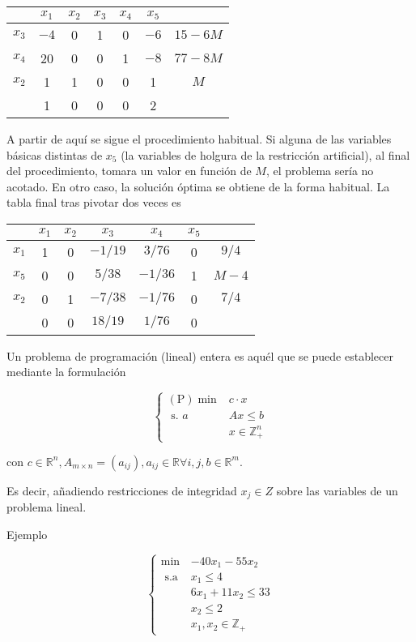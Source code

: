 \documentclass[openany]{book}
\begin{document}
\begin{example}
  \begin{tabular}{l|ccccc|c}
  \hline & $x_{1}$ & $x_{2}$ & $x_{3}$ & $x_{4}$ & $x_{5}$ & \\
  \hline$x_{3}$ & $-4$ & 0 & 1 & 0 & $-6$ & $15-6 M$ \\
  $x_{4}$ & 20 & 0 & 0 & 1 & $-8$ & $77-8 M$ \\
  $x_{2}$ & 1 & 1 & 0 & 0 & 1 & $M$ \\
  \hline & 1 & 0 & 0 & 0 & 2 & \\
  \hline
  \end{tabular}

  A partir de aquí se sigue el procedimiento habitual. Si alguna de las variables básicas distintas de $x_{5}$ (la variables de holgura de la restricción artificial), al final del procedimiento, tomara un valor en función de $M$, el problema sería no acotado. En otro caso, la solución óptima se obtiene de la forma habitual. La tabla final tras pivotar dos veces es

  \begin{tabular}{c|ccccc|c}
  \hline & $x_{1}$ & $x_{2}$ & $x_{3}$ & $x_{4}$ & $x_{5}$ & \\
  \hline$x_{1}$ & 1 & 0 & $-1 / 19$ & $3 / 76$ & 0 & $9 / 4$ \\
  $x_{5}$ & 0 & 0 & $5 / 38$ & $-1 / 36$ & 1 & $M-4$ \\
  $x_{2}$ & 0 & 1 & $-7 / 38$ & $-1 / 76$ & 0 & $7 / 4$ \\
  \hline & 0 & 0 & $18 / 19$ & $1 / 76$ & 0 & \\
  \hline
  \end{tabular}
\end{example}


Un problema de programación (lineal) entera es aquél que se puede establecer mediante la formulación

$$
\begin{cases}(\mathrm{P}) \min & c \cdot x \\ \text { s. } a & A x \leq b \\ & x \in \mathbb{Z}_{+}^{n}\end{cases}
$$

con $c \in \mathbb{R}^{n}, A_{m \times n}=\left(a_{i j}\right), a_{i j} \in \mathbb{R} \forall i, j, b \in \mathbb{R}^{m} .$

Es decir, añadiendo restricciones de integridad $x_{j} \in Z$ sobre las variables de un problema lineal.

Ejemplo

$$
\begin{cases}\min & -40 x_{1}-55 x_{2} \\ \text { s.a } & x_{1} \leq 4 \\ & 6 x_{1}+11 x_{2} \leq 33 \\ & x_{2} \leq 2 \\ & x_{1}, x_{2} \in \mathbb{Z}_{+}\end{cases}
$$
\end{document}
